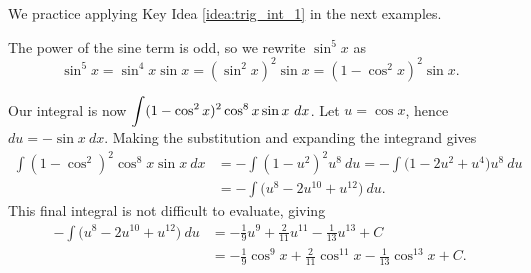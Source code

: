 We practice applying Key Idea \ref{idea:trig_int_1} in the next examples.\\

{The power of the sine term is odd, so we rewrite $\sin^5x$ as $$\sin^5x = \sin^4x\sin x = (\sin^2x)^2\sin x = (1-\cos^2x)^2\sin x.$$

Our integral is now $\displaystyle \int (1-\cos^2x)^2\cos^8x\sin x\ dx$. Let $u = \cos x$, hence $du = -\sin x\ dx$. Making the substitution and expanding the integrand gives
\begin{align*}
\int (1-\cos^2)^2\cos^8x\sin x\ dx &= -\int (1-u^2)^2u^8\ du = -\int \big(1-2u^2+u^4\big)u^8\ du \\
										&= -\int \big(u^8-2u^{10}+u^{12}\big)\ du.
\end{align*}
This final integral is not difficult to evaluate, giving 
\begin{align*} -\int \big(u^8-2u^{10}+u^{12}\big)\ du &= -\frac19u^9 + \frac2{11}u^{11} - \frac1{13}u^{13} + C \\
										&=-\frac19\cos^9 x + \frac2{11}\cos^{11} x - \frac1{13}\cos^{13} x + C.
\end{align*}
}\\

